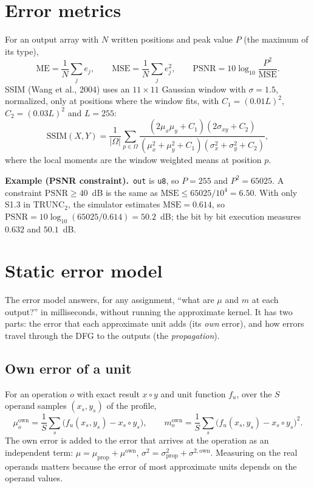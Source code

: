 \documentclass[11pt,a4paper]{article}
\newcommand{\examplebox}[2]{\par\medskip\noindent\colorbox{tabAzul!6}{\begin{minipage}{\dimexpr\linewidth-2\fboxsep}
  \textbf{Example (#1).}\ #2\end{minipage}}\par\medskip}
\begin{document}
\section{Error metrics}

For an output array with $N$ written positions and peak value $P$ (the maximum of its type),
\[
  \text{ME} = \frac{1}{N} \sum_{j} e_j, \qquad
  \text{MSE} = \frac{1}{N} \sum_{j} e_j^2, \qquad
  \text{PSNR} = 10 \log_{10} \frac{P^2}{\text{MSE}} .
\]
SSIM (Wang et al., 2004) uses an $11 \times 11$ Gaussian window with $\sigma = 1.5$, normalized, only at positions where
the window fits, with $C_1 = (0.01 L)^2$, $C_2 = (0.03 L)^2$ and $L = 255$:
\[
  \text{SSIM}(X, Y) = \frac{1}{|\Omega|} \sum_{p \in \Omega}
  \frac{(2 \mu_x \mu_y + C_1)(2 \sigma_{xy} + C_2)}{(\mu_x^2 + \mu_y^2 + C_1)(\sigma_x^2 + \sigma_y^2 + C_2)},
\]
where the local moments are the window weighted means at position $p$.

\examplebox{PSNR constraint}{\texttt{out} is \texttt{u8}, so $P = 255$ and $P^2 = 65025$. A constraint
$\text{PSNR} \ge 40$~dB is the same as $\text{MSE} \le 65025 / 10^{4} = 6.50$. With only S1.3 in $\text{TRUNC}_2$,
the simulator estimates $\text{MSE} = 0.614$, so $\text{PSNR} = 10 \log_{10}(65025 / 0.614) = 50.2$~dB; the bit by
bit execution measures $0.632$ and $50.1$~dB.}

\section{Static error model}\label{sec:err}

The error model answers, for any assignment, ``what are $\mu$ and $m$ at each output?'' in milliseconds, without
running the approximate kernel. It has two parts: the error that each approximate unit adds (its \emph{own} error),
and how errors travel through the DFG to the outputs (the \emph{propagation}).

\subsection{Own error of a unit}

For an operation $o$ with exact result $x \circ y$ and unit function $f_u$, over the $S$ operand samples
$(x_s, y_s)$ of the profile,
\[
  \mu_o^{\text{own}} = \frac{1}{S} \sum_{s} \big( f_u(x_s, y_s) - x_s \circ y_s \big), \qquad
  m_o^{\text{own}} = \frac{1}{S} \sum_{s} \big( f_u(x_s, y_s) - x_s \circ y_s \big)^2 .
\]
The own error is added to the error that arrives at the operation as an independent term:
$\mu = \mu_{\text{prop}} + \mu^{\text{own}}$, $\sigma^2 = \sigma^2_{\text{prop}} + \sigma^{2,\text{own}}$.
Measuring on the real operands matters because the error of most approximate units depends on the operand values.
\end{document}

